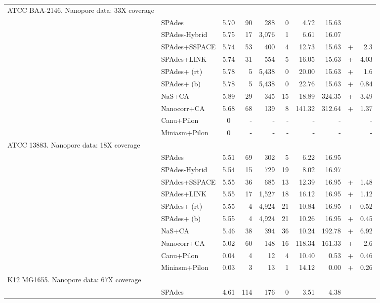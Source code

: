 \begin{longtable}{llcrrrrr@{\hspace{2pt}}c@{\hspace{2pt}}r}
\rowcolor{Gray} \multicolumn{10}{l}
{ \kp{} ATCC BAA-2146. Nanopore data: 33X coverage} \\  
 & SPAdes & 5.70 & 90 & 288 & 0 & 4.72 & 15.63 &  & \\
 & SPAdes-Hybrid & 5.75 & 17 & 3,076 & 1 & 6.61 & 16.07 &  & \\
 & SPAdes+SSPACE & 5.74 & 53 & 400 & 4 & 12.73 & 15.63 & + & 2.3 \\
 & SPAdes+LINK & 5.74 & 31 & 554 & 5 & 16.05 & 15.63 & + & 4.03 \\
 & SPAdes+\npscarf{} (rt)& 5.78 & 5 & 5,438 & 0 & 20.00 & 15.63 & + & 1.6 \\
 & SPAdes+\npscarf{} (b) & 5.78 & 5 & 5,438 & 0 & 22.76 & 15.63 & + & 0.84 \\
 & NaS+CA & 5.89 & 29 & 345 & 15 & 18.89 & 324.35 & + & 3.49 \\
 & Nanocorr+CA & 5.68 & 68 & 139 & 8 & 141.32 & 312.64 & + & 1.37 \\
 & Canu+Pilon & 0 &  -  &  -  &  -  &  -  &  -  &  &  -  \\
 & Miniasm+Pilon & 0 &  -  &  -  &  -  &  -  &  -  &  &  -  \\
\rowcolor{Gray} \multicolumn{10}{l}
{\kp{} ATCC 13883. Nanopore data:  18X coverage} \\ 
 & SPAdes & 5.51 & 69 & 302 & 5 & 6.22 & 16.95 &  & \\
 & SPAdes-Hybrid & 5.54 & 15 & 729 & 19 & 8.02 & 16.97 &  & \\
 & SPAdes+SSPACE & 5.55 & 36 & 685 & 13 & 12.39 & 16.95 & + & 1.48 \\
 & SPAdes+LINK & 5.55 & 17 & 1,527 & 18 & 16.12 & 16.95 & + & 1.12 \\
 & SPAdes+\npscarf{} (rt) & 5.55 & 4 & 4,924 & 21 & 10.84 & 16.95 & + & 0.52
 \\
 & SPAdes+\npscarf{} (b) & 5.55 & 4 & 4,924 & 21 & 10.26 & 16.95 & + & 0.45 \\
 & NaS+CA & 5.46 & 38 & 394 & 36 & 10.24 & 192.78 & + & 6.92 \\
 & Nanocorr+CA & 5.02 & 60 & 148 & 16 & 118.34 & 161.33 & + & 2.6 \\
 & Canu+Pilon & 0.04 & 4 & 12 & 4 & 10.40 & 0.53 & + & 0.46 \\
 & Miniasm+Pilon & 0.03 & 3 & 13 & 1 & 14.12 & 0.00 & + & 0.26 \\
\rowcolor{Gray} \multicolumn{10}{l}
{ \ec{} K12 MG1655. Nanopore data: 67X coverage} \\
 & SPAdes & 4.61 & 114 & 176 & 0 & 3.51 & 4.38 &  & \\

\end{longtable}
